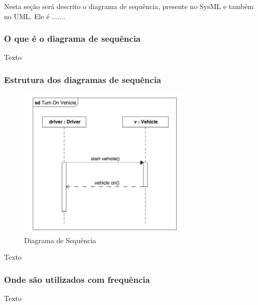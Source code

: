 Nesta seção será descrito o diagrama de sequência, presente no SysML e também no UML. Ele é .......


\subsubsection{O que é o diagrama de sequência}
Texto

\subsubsection{Estrutura dos diagramas de sequência}
\begin{figure}[h!]
\centering
\includegraphics[width=0.75\textwidth]{figures/diagrama-sequencia.jpeg}
\caption{Diagrama de Sequência}
\end{figure}
Texto

\subsubsection{Onde são utilizados com frequência}
Texto